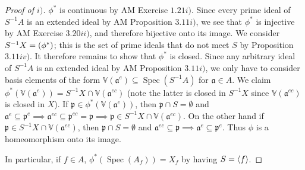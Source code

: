 \documentclass[12pt,letterpaper]{article}
\theoremstyle{definition}
\theoremstyle{remark}
\numberwithin{figure}{problem}
\numberwithin{equation}{section}
\let\Im\relax
\DeclareMathOperator{\Im}{Im}
\DeclareMathOperator{\Spec}{Spec}
\begin{document}
\begin{proof}[Proof of $i)$]
  $\phi^*$ is continuous by AM Exercise $1.21i)$. Since every prime ideal of $S^{-1}A$ is an extended ideal by AM Proposition $3.11i)$, we see that $\phi^*$ is injective by AM Exercise $3.20ii)$, and therefore bijective onto its image. We consider $S^{-1}X = \Im(\phi^*)$; this is the set of prime ideals that do not meet $S$ by Proposition $3.11iv)$. It therefore remains to show that $\phi^*$ is closed. Since any arbitrary ideal of $S^{-1}A$ is an extended ideal by AM Proposition $3.11i)$, we only have to consider basis elements of the form $\mathbb{V}(\mathfrak{a}^e) \subseteq \Spec(S^{-1}A)$ for $\mathfrak{a} \in A$. We claim $\phi^*(\mathbb{V}(\mathfrak{a}^e)) = S^{-1}X \cap \mathbb{V}(\mathfrak{a}^{ec})$ (note the latter is closed in $S^{-1}X$ since $\mathbb{V}(\mathfrak{a}^{ec})$ is closed in $X$). If $\mathfrak{p} \in \phi^*(\mathbb{V}(\mathfrak{a}^e))$, then $\mathfrak{p} \cap S = \emptyset$ and $\mathfrak{a}^e \subseteq \mathfrak{p}^e \implies \mathfrak{a}^{ec} \subseteq \mathfrak{p}^{ec} = \mathfrak{p} \implies \mathfrak{p} \in S^{-1}X \cap \mathbb{V}(\mathfrak{a}^{ec})$. On the other hand if $\mathfrak{p} \in S^{-1}X \cap \mathbb{V}(\mathfrak{a}^{ec})$, then $\mathfrak{p} \cap S = \emptyset$ and $\mathfrak{a}^{ec} \subseteq \mathfrak{p} \implies \mathfrak{a}^e \subseteq \mathfrak{p}^e$. Thus $\phi$ is a homeomorphism onto its image.
  \par In particular, if $f \in A$, $\phi^*(\Spec(A_f)) = X_f$ by having $S = \braket{f}$.
\end{proof}
\end{document}
